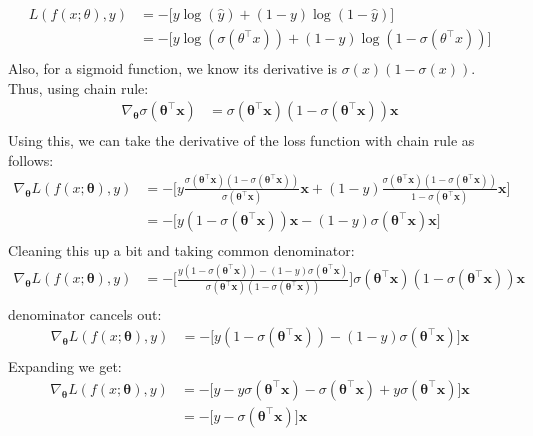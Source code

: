 \documentclass[a4paper]{article}
\theoremstyle{definition}
\newcommand{\vx}{\mathbf{x}}
\newcommand{\vtheta}{\mathbf{\theta}}
\newenvironment{soln}{
    \leavevmode\color{blue}\ignorespaces
}{}
\begin{document}
\begin{enumerate}
\begin{enumerate}
	\begin{soln}
		\begin{align*}
		L(f(x;\theta), y) &= -\Big[y \log(\hat{y}) + (1-y) \log(1- \hat{y})\Big] \\
		&= -\Big[y \log(\sigma(\theta^\top x)) + (1-y) \log(1- \sigma(\theta^\top x))\Big] \\
		\end{align*}
		Also, for a sigmoid function, we know its derivative is $\sigma(x)(1-\sigma(x))$. Thus, using chain rule:
		\begin{align*}
			\nabla_{\vtheta} \sigma(\vtheta^\top \vx) &= \sigma(\vtheta^\top \vx)(1-\sigma(\vtheta^\top \vx))\vx \\
		\end{align*}
		Using this, we can take the derivative of the loss function with chain rule as follows:
		\begin{align*}
		\nabla_{\vtheta} L(f(x;\vtheta), y) &= -\Big[y \frac{\sigma(\vtheta^\top \vx)(1-\sigma(\vtheta^\top \vx))}{\sigma(\vtheta^\top \vx)}\vx + (1-y) \frac{\sigma(\vtheta^\top \vx)(1-\sigma(\vtheta^\top \vx))}{1-\sigma(\vtheta^\top \vx)}\vx\Big] \\
		&= -\Big[y (1-\sigma(\vtheta^\top \vx))\vx - (1-y) \sigma(\vtheta^\top \vx)\vx\Big] \\
		\end{align*}
		Cleaning this up a bit and taking common denominator:
		\begin{align*}
		\nabla_{\vtheta} L(f(x;\vtheta), y) &= -\Big[\frac {y (1-\sigma(\vtheta^\top \vx)) - (1-y) \sigma(\vtheta^\top \vx)}{\sigma(\vtheta^\top \vx)(1-\sigma(\vtheta^\top \vx))}\Big] \sigma(\vtheta^\top \vx)(1-\sigma(\vtheta^\top \vx))\vx \\
		\end{align*}
		denominator cancels out:
		\begin{align*}
		\nabla_{\vtheta} L(f(x;\vtheta), y) &= -\Big[y (1-\sigma(\vtheta^\top \vx)) - (1-y) \sigma(\vtheta^\top \vx)\Big] \vx \\
		\end{align*}
		Expanding we get:
		\begin{align*}
		\nabla_{\vtheta} L(f(x;\vtheta), y) &= -\Big[y - y\sigma(\vtheta^\top \vx) - \sigma(\vtheta^\top \vx) + y\sigma(\vtheta^\top \vx)\Big] \vx \\
		&= -\Big[y - \sigma(\vtheta^\top \vx)\Big] \vx \\
		\end{align*}
	\end{soln}
	

\end{enumerate}
\end{enumerate}
\end{document}
